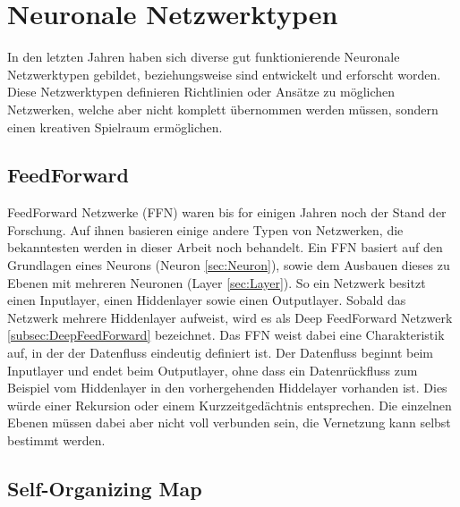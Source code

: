 
\section{Neuronale Netzwerktypen}

In den letzten Jahren haben sich diverse gut funktionierende Neuronale Netzwerktypen gebildet, beziehungsweise sind entwickelt und erforscht worden. 
Diese Netzwerktypen definieren Richtlinien oder Ansätze zu möglichen Netzwerken, welche aber nicht komplett übernommen werden müssen, sondern einen kreativen Spielraum ermöglichen. \\


\subsection{FeedForward}
\label{subsec:FeedForward}

FeedForward Netzwerke (FFN) waren bis for einigen Jahren noch der Stand der Forschung.
Auf ihnen basieren einige andere Typen von Netzwerken, die bekanntesten werden in dieser Arbeit noch behandelt.
Ein FFN basiert auf den Grundlagen eines Neurons (Neuron \ref{sec:Neuron}), sowie dem Ausbauen dieses zu Ebenen mit mehreren Neuronen (Layer \ref{sec:Layer}).
So ein Netzwerk besitzt einen Inputlayer, einen Hiddenlayer sowie einen Outputlayer.
Sobald das Netzwerk mehrere Hiddenlayer aufweist, wird es als Deep FeedForward Netzwerk \ref{subsec:DeepFeedForward} bezeichnet.
Das FFN weist dabei eine Charakteristik auf, in der der Datenfluss eindeutig definiert ist. 
Der Datenfluss beginnt beim Inputlayer und endet beim Outputlayer, ohne dass ein Datenrückfluss zum Beispiel vom Hiddenlayer in den vorhergehenden Hiddelayer vorhanden ist.
Dies würde einer Rekursion oder einem Kurzzeitgedächtnis entsprechen.
Die einzelnen Ebenen müssen dabei aber nicht voll verbunden sein, die Vernetzung kann selbst bestimmt werden.

\subsection{Self-Organizing Map}
\label{subsec:SelfOrganizingMap}

